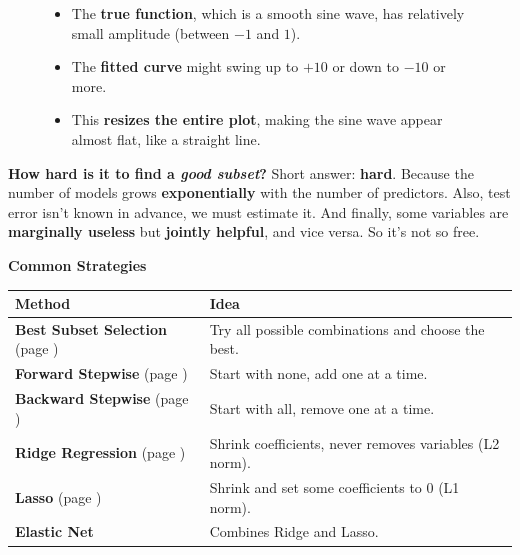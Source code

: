 \begin{figure}[!htp]
{\begin{itemize}
        \begin{itemize}
            \item The \textbf{true function}, which is a smooth sine wave, has relatively small amplitude (between $-1$ and $1$).
            \item The \textbf{fitted curve} might swing up to $+10$ or down to $-10$ or more.
            \item This \textbf{resizes the entire plot}, making the sine wave appear almost flat, like a straight line.
        \end{itemize}
    \end{itemize}}
\end{figure}

\highspace
\textcolor{Red2}{ \textbf{How hard is it to find a \emph{good subset}?}} Short answer: \textbf{hard}. Because the number of models grows \textbf{exponentially} with the number of predictors. Also, test error isn't known in advance, we must estimate it. And finally, some variables are \textbf{marginally useless} but \textbf{jointly helpful}, and vice versa. So it's not so free.

\highspace
\begin{flushleft}
    \textcolor{Green3}{ \textbf{Common Strategies}}
\end{flushleft}
\begin{table}[!htp]
    \centering
    \begin{adjustbox}{width={\textwidth},totalheight={\textheight},keepaspectratio}
        \begin{tabular}{@{} l l @{}}
            \toprule
            Method & Idea \\
            \midrule
            \textbf{Best Subset Selection} (page \pageref{subsubsection: Best Subset Selection})    & Try all possible combinations and choose the best.           \\ [.3em]
            \textbf{Forward Stepwise} (page \pageref{subsubsection: Forward Stepwise})              & Start with none, add one at a time.                        \\ [.3em]
            \textbf{Backward Stepwise} (page \pageref{subsubsection: Backward Stepwise})            & Start with all, remove one at a time.                      \\ [.3em]
            \textbf{Ridge Regression} (page \pageref{paragraph: Ridge Regression})                  & Shrink coefficients, never removes variables (L2 norm).    \\ [.3em]
            \textbf{Lasso} (page \pageref{paragraph: Lasso})                                        & Shrink and set some coefficients to 0 (L1 norm).       \\ [.3em]
            \textbf{Elastic Net}            & Combines Ridge and Lasso.                                    \\
            \bottomrule
        \end{tabular}
    \end{adjustbox}
\end{table}